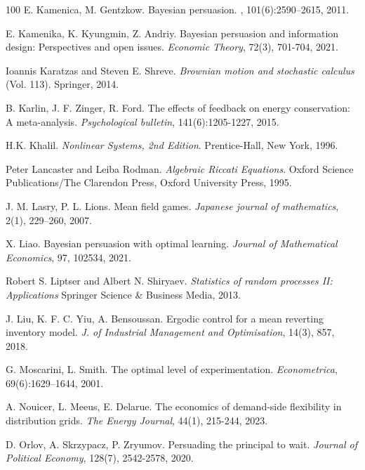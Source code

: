 \documentclass[a4paper,10pt]{article}
\theoremstyle{definition}
\theoremstyle{plain}
\numberwithin{equation}{section}
\begin{document}
\begin{thebibliography}{100}
E. Kamenica, M. Gentzkow.
\newblock Bayesian persuasion.
, 101(6):2590--2615, 2011.

E. Kamenika, K. Kyungmin, Z. Andriy. Bayesian persuasion and information design: Perspectives and open issues. {\em Economic Theory}, 72(3), 701-704, 2021.

Ioannis Karatzas and Steven E. Shreve. \emph{Brownian motion and stochastic calculus} (Vol. 113). Springer, 2014.

B. Karlin, J. F. Zinger, R. Ford. The effects of feedback on energy conservation: A meta-analysis. {\em Psychological bulletin}, 141(6):1205-1227, 2015.

H.K. Khalil. {\em Nonlinear Systems, 2nd Edition}. Prentice-Hall, New York, 1996.

Peter Lancaster and Leiba Rodman. {\em Algebraic Riccati Equations}. Oxford Science Publications/The Clarendon Press, Oxford University Press, 1995.

J. M. Lasry, P. L. Lions. Mean field games. {\em Japanese journal of mathematics}, 2(1), 229--260, 2007.

X. Liao. Bayesian persuasion with optimal learning. {\em Journal of Mathematical Economics}, 97, 102534, 2021.

Robert S. Liptser and Albert N. Shiryaev. {\em Statistics of random processes II: Applications} Springer Science \& Business Media, 2013.

J. Liu, K. F. C. Yiu, A. Bensoussan. Ergodic control for a mean reverting inventory model. {\em J. of Industrial Management and Optimisation}, 14(3), 857, 2018.


 G. Moscarini, L. Smith. The optimal level of experimentation. {\em Econometrica}, 69(6):1629--1644, 2001.

A. Nouicer, L. Meeus, E. Delarue. The economics of demand-side flexibility in distribution grids. {\em The Energy Journal}, 44(1), 215-244, 2023.

D. Orlov, A. Skrzypacz, P. Zryumov. Persuading the principal to wait. {\em Journal of Political Economy}, 128(7), 2542-2578, 2020.


\end{thebibliography}
\end{document}
